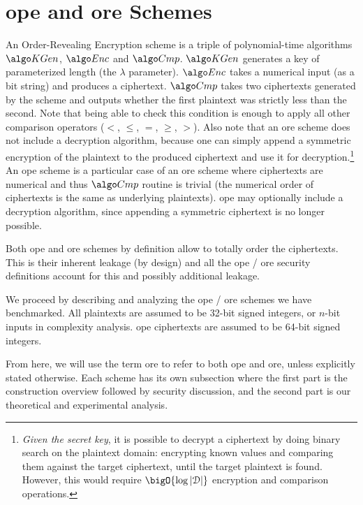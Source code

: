 \section{\acrshort{ope} and \acrshort{ore} Schemes}

	An Order-Revealing Encryption scheme is a triple of polynomial\hyp{}time algorithms $\setup$, $\encrypt$ and $\compare$.
	$\setup$ generates a key of parameterized length (the $\lambda$ parameter).
	$\encrypt$ takes a numerical input (as a bit string) and produces a ciphertext.
	$\compare$ takes two ciphertexts generated by the scheme and outputs whether the first plaintext was strictly less than the second.
	Note that being able to check this condition is enough to apply all other comparison operators ($<$, $\le$, $=$, $\ge$, $>$).
	Also note that an \acrshort{ore} scheme does not include a decryption algorithm, because one can simply append a symmetric encryption of the plaintext to the produced ciphertext and use it for decryption.\footnote{
		\emph{Given the secret key}, it is possible to decrypt a ciphertext by doing binary search on the plaintext domain: encrypting known values and comparing them against the target ciphertext, until the target plaintext is found.
		However, this would require $\bigO{\log{|\domain|}}$ encryption and comparison operations.
	}
	An \acrfull{ope} scheme is a particular case of an \acrshort{ore} scheme where ciphertexts are numerical and thus $\compare$ routine is trivial (the numerical order of ciphertexts is the same as underlying plaintexts).
	\acrshort{ope} may optionally include a decryption algorithm, since appending a symmetric ciphertext is no longer possible.

	Both \acrshort{ope} and \acrshort{ore} schemes by definition allow to totally order the ciphertexts.
	This is their inherent leakage (by design) and all the \acrshort{ope} / \acrshort{ore} security definitions account for this and possibly additional leakage.

	We proceed by describing and analyzing the \acrshort{ope} / \acrshort{ore} schemes we have benchmarked.
	All plaintexts are assumed to be 32-bit signed integers, or $n$-bit inputs in complexity analysis.
	\acrshort{ope} ciphertexts are assumed to be 64-bit signed integers.

	From here, we will use the term \acrshort{ore} to refer to both \acrshort{ope} and \acrshort{ore}, unless explicitly stated otherwise.
	Each scheme has its own subsection where the first part is the construction overview followed by security discussion, and the second part is our theoretical and experimental analysis.

